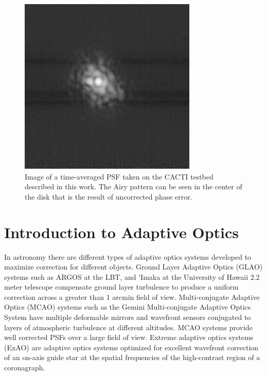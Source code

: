 \begin{figure}
    \centering
    \includegraphics{Chapter Materials/Chapter One Materials/turbPSF.png}
    \caption{Image of a time-averaged PSF taken on the CACTI testbed described in this work. The Airy pattern can be seen in the center of the disk that is the result of uncorrected phase error.}
    \label{fig:turbPSF}
\end{figure}


 \section{Introduction to Adaptive Optics}
 

In astronomy there are different types of adaptive optics systems developed to maximize correction for different objects. Ground Layer Adaptive Optics (GLAO) systems such as ARGOS \citep{rabien2019argos} at the LBT, and 'Imaka \citep{abdurrahman2018improved} at the University of Hawaii 2.2 meter telescope compensate ground layer turbulence to produce a uniform correction across a greater than 1 arcmin field of view. Multi-conjugate Adaptive Optics (MCAO) systems such as the Gemini Multi-conjugate Adaptive Optics System \citep{neichel2014gemini} have multiple deformable mirrors and wavefront sensors conjugated to layers of atmospheric turbulence at different altitudes. MCAO systems provide well corrected PSFs over a large field of view. Extreme adaptive optics systems (ExAO) are adaptive optics systems optimized for excellent wavefront correction of an on-axis guide star at the spatial frequencies of the high-contrast region of a coronagraph. 

